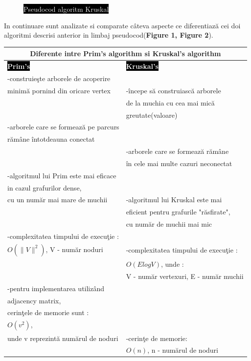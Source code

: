\documentclass[14pt]{article}
\begin{document}
\begin{figure}[h]
\begin{center}
\begin{tabbing}
\vspace{20mm}

\end{tabbing}
\caption{\colorbox{black}{\textcolor{white}{Pseudocod algoritm Kruskal}}}
\end{center}
\end{figure}

\newpage

In continuare sunt analizate si comparate c\^ateva aspecte ce diferentiaz\u{a} cei doi algoritmi descrisi anterior in limbaj pseudocod(\textbf{Figure 1, Figure 2}).

\vspace{7mm}

\begin{center} 
\begin{tabular}{|l|l|}
\hline \multicolumn{2}{|c|}{\textbf{Diferente intre Prim's algorithm si Kruskal's algorithm}}\\
\hline
\textbf{\colorbox{black}{\textcolor{white}{Prim's}}} & \textbf{\colorbox{black}{\textcolor{white}{Kruskal's}}}\\
\hline
-construie\c ste arborele de acoperire\\ minim\u{a} pornind din oricare vertex & -\^incepe s\u{a} construiasc\u{a} arborele\\& de la  muchia cu cea mai mic\u{a}\\& greutate(valoare) \\ -arborele care se formeaz\u{a} pe parcurs\\ r\u{a}m\^ane \^intotdeauna conectat \\& -arborele care se formeaz\u{a} r\u{a}m\^ane \\& \^in cele mai multe cazuri neconectat \\  -algoritmul lui Prim este mai eficace\\ in cazul grafurilor dense,\\ cu un num\u{a}r mai mare de muchii & -algoritmul lui Kruskal este mai\\& eficient pentru grafurile "r\u{a}sfirate",\\& cu num\u{a}r de muchii mai mic \\ -complexitatea timpului de execu\c tie :\\ $O(\|V\|^2)$,  V - num\u{a}r noduri & -complexitatea timpului de execu\c tie :\\& $O(ElogV)$, unde :\\& V - num\u{a}r vertexuri, E - num\u{a}r muchii \\ -pentru implementarea utiliz\^and\\ adjacency matrix,\\ cerin\c tele de memorie sunt :\\ $O(v^2)$, \\unde v reprezint\u{a} num\u{a}rul de noduri &  -cerin\c te de memorie:\\& $O(n)$,  n - num\u{a}rul de noduri\\
\hline
\end{tabular} \end{center} 
\vspace{5mm}
\end{document}
